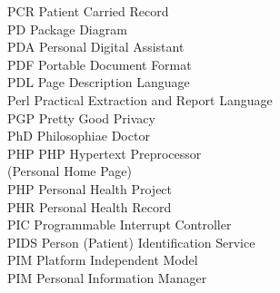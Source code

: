 \begin{tabbing}
    \>PCR \>\>Patient Carried Record\\


    \>PD \>\>Package Diagram\\

    \>PDA \>\>Personal Digital Assistant\\

    \>PDF \>\>Portable Document Format\\

    \>PDL \>\>Page Description Language\\




    \>Perl \>\>Practical Extraction and Report Language\\

    \>PGP \>\>Pretty Good Privacy\\


    \>PhD \>\>Philosophiae Doctor\\

    \>PHP \>\>PHP Hypertext Preprocessor\\
        \>\>\>(Personal Home Page)\\

    \>PHP \>\>Personal Health Project\\

    \>PHR \>\>Personal Health Record\\

    \>PIC \>\>Programmable Interrupt Controller\\


    \>PIDS \>\>Person (Patient) Identification Service\\

    \>PIM \>\>Platform Independent Model\\

    \>PIM \>\>Personal Information Manager\\


\end{tabbing}
